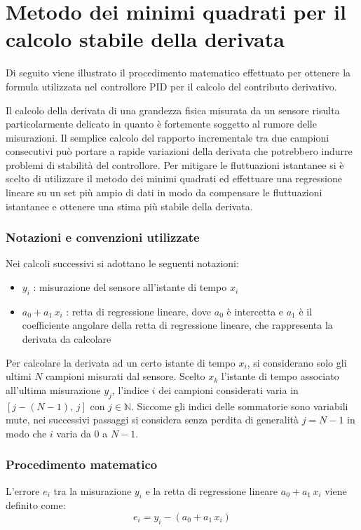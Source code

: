 \appendix
\chapter{Metodo dei minimi quadrati per il calcolo stabile della derivata}
Di seguito viene illustrato il procedimento matematico effettuato per ottenere la formula utilizzata nel controllore PID per
il calcolo del contributo derivativo.

Il calcolo della derivata di una grandezza fisica misurata da un sensore risulta particolarmente delicato in quanto è fortemente
soggetto al rumore delle misurazioni. Il semplice calcolo del rapporto incrementale tra due campioni consecutivi può portare
a rapide variazioni della derivata che potrebbero indurre problemi di stabilità del controllore. Per mitigare le fluttuazioni
istantanee si è scelto di utilizzare il metodo dei minimi quadrati ed effettuare una regressione lineare su un set più ampio
di dati in modo da compensare le fluttuazioni istantanee e ottenere una stima più stabile della derivata.

\subsection*{Notazioni e convenzioni utilizzate}
Nei calcoli successivi si adottano le seguenti notazioni:
\begin{itemize}
	\item \(y_i\) : misurazione del sensore all'istante di tempo \(x_i\)
	\item \(a_0 + a_1 \, x_i\) : retta di regressione lineare, dove \(a_0\) è intercetta e \(a_1\) è il coefficiente angolare
	della retta di regressione lineare, che rappresenta la derivata da calcolare
\end{itemize}

Per calcolare la derivata ad un certo istante di tempo \(x_i\), si considerano solo gli ultimi \(N\) campioni misurati dal
sensore. Scelto \(x_k\) l'istante di tempo associato all'ultima misurazione \(y_j\), l'indice \(i\) dei campioni considerati
varia in \([j \!-\! (N \!-\! 1), \, j]\) con \(j \in \mathbb{N}\). Siccome gli indici delle sommatorie sono variabili mute,
nei successivi passaggi si considera senza perdita di generalità \(j = N \!-\! 1\) in modo che \(i\) varia da \(0\) a \(N-1\).

\subsection*{Procedimento matematico}
L'errore \(e_i\) tra la misurazione \(y_i\) e la retta di regressione lineare \(a_0 + a_1 \, x_i\) viene definito come:
\begin{equation}
	e_i = y_i - (a_0 + a_1 \, x_i)
\end{equation}

